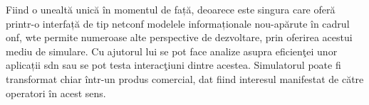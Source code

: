 Fiind o unealtă unică în momentul de față, deoarece este singura care oferă printr-o interfață de tip \gls{netconf} modelele informaționale nou-apărute în cadrul \gls{onf}, \gls{wte} permite numeroase alte perspective de dezvoltare, prin oferirea acestui mediu de simulare. Cu ajutorul lui se pot face analize asupra eficienţei unor aplicații \gls{sdn} sau se pot testa interacţiuni dintre acestea. Simulatorul poate fi transformat chiar într-un produs comercial, dat fiind interesul manifestat de către operatori în acest sens.